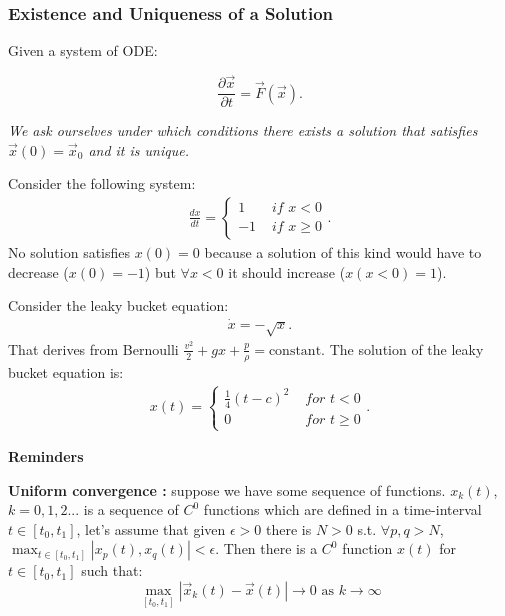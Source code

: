 \subsubsection{Existence and Uniqueness of a Solution}

Given a system of ODE:

\[ \frac{\partial \vec{x}}{\partial t} = \vec{F}(\vec{x}). \]

\textit{We ask ourselves under which conditions there exists a solution that satisfies $\vec{x}(0) = \vec{x}_0$ and it is unique.}

\begin{example}
    Consider the following system: 
    \begin{align*}
        \frac{dx}{dt} = 
        \begin{cases}
            1 & \textit{ if } x < 0 \\
            -1 & \textit{ if } x \geq 0 
        \end{cases}.
    \end{align*}
    No solution satisfies $x(0)=0$ because a solution of this kind would have to decrease ($x(0) = -1$) but $\forall x < 0$ it should increase ($x(x<0) = 1$).
\end{example}

\begin{example}
    Consider the leaky bucket equation: 
    \begin{align*}
        \dot{x} = - \sqrt{x}.
    \end{align*}
    That derives from Bernoulli $\frac{v^2}{2} + gx + \frac{p}{\rho} = \text{constant}$. The solution of the leaky bucket equation is:
\begin{align*}
    x(t) = 
    \begin{cases}
    \frac{1}{4} (t-c)^2 & \textit{ for } t < 0 \\
    0 & \textit{ for } t \geq 0 
    \end{cases}.
\end{align*}
\end{example}

\noindent
\textbf{Reminders}

\begin{definition}
    \textbf{Uniform convergence :} suppose we have some sequence of functions. $x_k(t)$, $k=0,1,2...$ is a sequence of $C^0$ functions which are defined in a time-interval $t \in [t_0,t_1]$, let's assume that given $\epsilon > 0$ there is $N>0$ s.t. $\forall p,q > N$, $\max_{t \in [t_0,t_1]} |x_p(t),x_q(t)| < \epsilon$. Then there is a $C^0$ function $x(t)$ for $t \in [t_0,t_1]$ such that: 
    \[
        \max_{[t_0,t_1]} |\vec{x}_k(t) - \vec{x}(t)| \rightarrow 0 \text{ as } k \rightarrow \infty
    \]
\end{definition}


